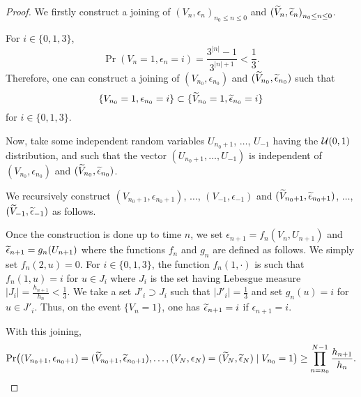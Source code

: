 \documentclass[12pt,a4paper]{article}
\begin{document}
\begin{proof}
We firstly construct a joining of 
${(V_n, \epsilon_n)}_{n_0 \leq n \leq 0}$ and 
${(\widetilde{V}_n, \widetilde{\epsilon}_n)}_{n_0 \leq n \leq 0}$.

For $i \in \{0, 1, 3\}$, 
$$
\Pr(V_n=1, \epsilon_n=i) = \frac{3^{|n|}-1}{3^{|n|+1}} < \frac{1}{3}.
$$
Therefore, one can construct a joining of 
$(V_{n_0}, \epsilon_{n_0})$ and $(\widetilde{V}_{n_0},\widetilde{\epsilon}_{n_0})$ such that  
$$
\{V_{n_0}=1, \epsilon_{n_0}=i\} \subset \{\widetilde{V}_{n_0}=1,\widetilde{\epsilon}_{n_0} = i\} 
$$
for $i \in \{0,1,3\}$. 


Now, take some independent random variables $U_{n_0+1}$, $\ldots$, $U_{-1}$ 
having the $\mathcal{U}(0,1)$ distribution, and such that the vector $(U_{n_0+1}, \ldots, U_{-1})$ 
is independent of $(V_{n_0}, \epsilon_{n_0})$ and $(\widetilde{V}_{n_0},\widetilde{\epsilon}_{n_0})$. 

We recursively construct $(V_{n_0+1}, \epsilon_{n_0+1})$, $\ldots$, $(V_{-1}, \epsilon_{-1})$ 
and $(\widetilde{V}_{n_0+1}, \widetilde{\epsilon}_{n_0+1})$, $\ldots$, $(\widetilde{V}_{-1}, \widetilde{\epsilon}_{-1})$ 
as follows.

Once the construction is done up to time $n$, we set 
$\epsilon_{n+1} = f_n(V_n, U_{n+1})$ and $\widetilde{\epsilon}_{n+1} = g_n(U_{n+1})$ 
where the functions $f_n$ and $g_n$ are defined as follows. 
We simply set $f_n(2, u)=0$. 
For $i \in \{0,1,3\}$, the function $f_n(1, \cdot)$ is such that  
$f_n(1, u) = i$ for $u \in J_i$ 
where $J_i$ is the set having Lebesgue measure 
$|J_i| = \frac{h_{n+1}}{h_{n}} < \frac{1}{3}$. 
We take a set $J'_i \supset J_i$ such that $|J'_i|=\frac{1}{3}$ 
and set $g_n(u)=i$ for $u \in J'_i$. 
Thus, on the event $\{V_n=1\}$, one has $\widetilde{\epsilon}_{n+1}=i$ if $\epsilon_{n+1}=i$. 

With this joining, 
$$
\Pr\bigl((V_{n_0+1}, \epsilon_{n_0+1})=(\widetilde{V}_{n_0+1}, \widetilde{\epsilon}_{n_0+1}), 
\ldots, (V_N, \epsilon_{N})=(\widetilde{V}_{N},\widetilde{\epsilon}_{N}) 
\mid V_{n_0}=1 \bigr) \geq \prod_{n=n_0}^{N-1} \frac{h_{n+1}}{h_{n}}.  
$$


\end{proof}
\end{document}
